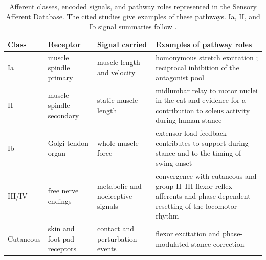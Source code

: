 \begin{table}[htbp]
\caption{Afferent classes, encoded signals, and pathway roles represented in the Sensory Afferent Database. The cited studies give examples of these pathways. Ia, II, and Ib signal summaries follow \citet{prochazka_ensemble_1998}.}
\label{tab:sadb_afferents}
\small
\begin{tabularx}{\textwidth}{@{}>{\raggedright\arraybackslash}p{}>{\raggedright\arraybackslash}p{}>{\raggedright\arraybackslash}p{}>{\raggedright\arraybackslash}X@{}}
\toprule
\textbf{Class} & \textbf{Receptor} & \textbf{Signal carried} & \textbf{Examples of pathway roles} \\
\midrule
Ia & muscle spindle primary & muscle length and velocity & homonymous stretch excitation \citep{eccles_integrative_1958}; reciprocal inhibition of the antagonist pool \citep{jankowska_effect_1967} \\
II & muscle spindle secondary & static muscle length & midlumbar relay to motor nuclei in the cat \citep{edgley_interneuronal_1987} and evidence for a contribution to soleus activity during human stance \citep{mazzaro_afferent_2006} \\
Ib & Golgi tendon organ & whole-muscle force & extensor load feedback contributes to support during stance and to the timing of swing onset \citep{dietz_significance_2000, dominguez_candidate_2020} \\
III/IV & free nerve endings & metabolic and nociceptive signals & convergence with cutaneous and group II--III flexor-reflex afferents and phase-dependent resetting of the locomotor rhythm \citep{schomburg_flexor_1998} \\
Cutaneous & skin and foot-pad receptors & contact and perturbation events & flexor excitation and phase-modulated stance correction \citep{sherrington_flexion_1910, forssberg_stumbling_1979} \\
\bottomrule
\end{tabularx}
\end{table}

